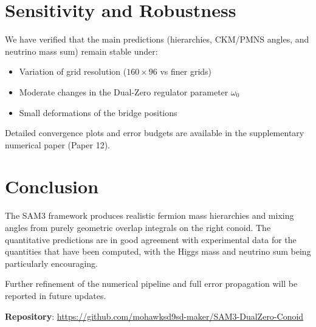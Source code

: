 \documentclass[11pt,a4paper]{article}
\begin{document}
\section{Sensitivity and Robustness}

We have verified that the main predictions (hierarchies, CKM/PMNS angles, and neutrino mass sum) remain stable under:
\begin{itemize}
    \item Variation of grid resolution (\(160\times96\) vs finer grids)
    \item Moderate changes in the Dual-Zero regulator parameter \(\omega_0\)
    \item Small deformations of the bridge positions
\end{itemize}

Detailed convergence plots and error budgets are available in the supplementary numerical paper (Paper 12).

\section{Conclusion}

The SAM3 framework produces realistic fermion mass hierarchies and mixing angles from purely geometric overlap integrals on the right conoid. The quantitative predictions are in good agreement with experimental data for the quantities that have been computed, with the Higgs mass and neutrino sum being particularly encouraging.

Further refinement of the numerical pipeline and full error propagation will be reported in future updates.

\vspace{1em}
\textbf{Repository}: \url{https://github.com/mohawksd9sd-maker/SAM3-DualZero-Conoid}
\end{document}

